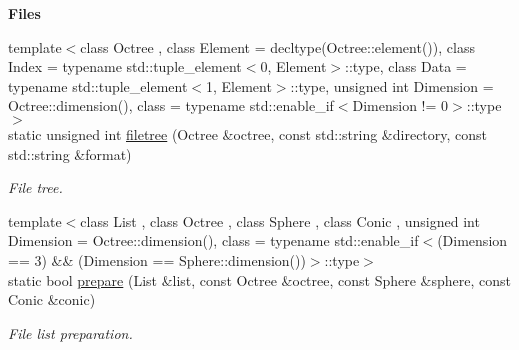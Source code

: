 \begin{Indent}{\bf Files}\par
\begin{DoxyCompactItemize}
\item 
{\footnotesize template$<$class Octree , class Element  = decltype(\-Octree\-::element()), class Index  = typename std\-::tuple\-\_\-element$<$0, Element$>$\-::type, class Data  = typename std\-::tuple\-\_\-element$<$1, Element$>$\-::type, unsigned int Dimension = Octree\-::dimension(), class  = typename std\-::enable\-\_\-if$<$\-Dimension != 0$>$\-::type$>$ }\\static unsigned int \hyperlink{exceptionInput_a55ab9761312068b1da1f4498b82526a4}{filetree} (Octree \&octree, const std\-::string \&directory, const std\-::string \&format)
\begin{DoxyCompactList}\small\item\em File tree. \end{DoxyCompactList}\item 
{\footnotesize template$<$class List , class Octree , class Sphere , class Conic , unsigned int Dimension = Octree\-::dimension(), class  = typename std\-::enable\-\_\-if$<$(\-Dimension == 3) \&\& (\-Dimension == Sphere\-::dimension())$>$\-::type$>$ }\\static bool \hyperlink{exceptionInput_ab975c15aeb6fbbaeef11586b4bb10282}{prepare} (List \&list, const Octree \&octree, const Sphere \&sphere, const Conic \&conic)
\begin{DoxyCompactList}\small\item\em File list preparation. \end{DoxyCompactList}\end{DoxyCompactItemize}
\end{Indent}
